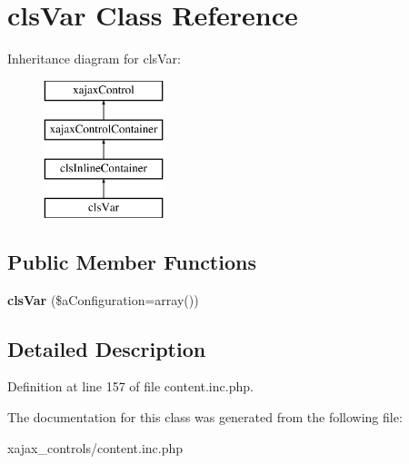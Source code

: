 \hypertarget{classclsVar}{
\section{clsVar Class Reference}
\label{classclsVar}
}
Inheritance diagram for clsVar:\begin{figure}[H]
\begin{center}
\leavevmode
\includegraphics[height=4.000000cm]{classclsVar}
\end{center}
\end{figure}
\subsection*{Public Member Functions}
\begin{DoxyCompactItemize}
\item 
\hypertarget{classclsVar_a95212175070852344e1b98744a25de46}{
{\bfseries clsVar} (\$aConfiguration=array())}
\label{classclsVar_a95212175070852344e1b98744a25de46}

\end{DoxyCompactItemize}


\subsection{Detailed Description}


Definition at line 157 of file content.inc.php.



The documentation for this class was generated from the following file:\begin{DoxyCompactItemize}
\item 
xajax\_\-controls/content.inc.php\end{DoxyCompactItemize}
